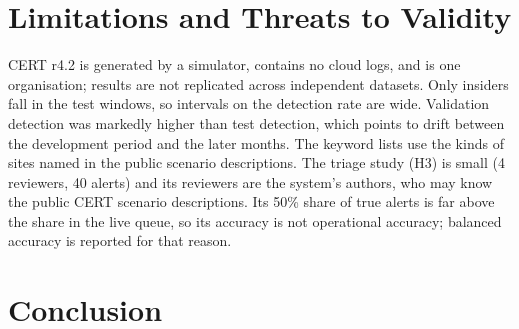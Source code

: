 \documentclass[conference]{IEEEtran}
\begin{document}
\section{Limitations and Threats to Validity}
CERT r4.2 is generated by a simulator, contains no cloud logs, and is one organisation; results
are not replicated across independent datasets. Only \NInsTest{} insiders fall in the test windows,
so intervals on the detection rate are wide. Validation detection was markedly higher than test
detection, which points to drift between the development period and the later months. The keyword
lists use the kinds of sites named in the public scenario descriptions. The triage study (H3) is
small (4 reviewers, 40 alerts) and its reviewers are the system's authors, who may know the public CERT scenario
descriptions. Its 50\% share of true alerts is far above the share in the live queue, so its
accuracy is not operational accuracy; balanced accuracy is reported for that reason.

\section{Conclusion}




\end{document}
